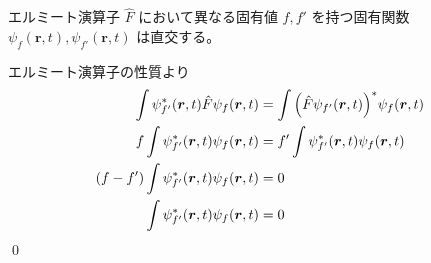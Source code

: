 \documentclass[uplatex,dvipdfmx,a4paper,11pt]{jlreq}
\makeatletter
\newcommand{\rr}{\bm{r}}
\numberwithin{equation}{section}
\theoremstyle{definition}
\renewenvironment{proof}[1][\proofname]{\par
  \normalfont
  \topsep6\p@\@plus6\p@ \trivlist
  \item[\hskip\labelsep{\bfseries #1}\@addpunct{\bfseries}]\ignorespaces\quad\par
}{%
  \qed\endtrivlist\@endpefalse
}
\renewcommand\proofname{証明}
\makeatother
\begin{document}
\begin{theorem}
  エルミート演算子 $\hat{F}$ において異なる固有値 $f, f'$ を持つ固有関数 $\psi_f(\rr, t), \psi_{f'}(\rr, t)$ は直交する。
\end{theorem}
\begin{proof}
  エルミート演算子の性質より
  \begin{align}
    \int\psi_{f'}^*(\rr, t)\hat{F}\psi_f(\rr, t)  & = \int\qty(\hat{F}\psi_{f'}(\rr, t))^*\psi_f(\rr, t) \\
    f\int\psi_{f'}^*(\rr, t)\psi_f(\rr, t)        & = f'\int\psi_{f'}^*(\rr, t)\psi_f(\rr, t)            \\
    (f - f')\int\psi_{f'}^*(\rr, t)\psi_f(\rr, t) & = 0                                                  \\
    \int\psi_{f'}^*(\rr, t)\psi_f(\rr, t)         & = 0
  \end{align}
\end{proof}
\end{document}
